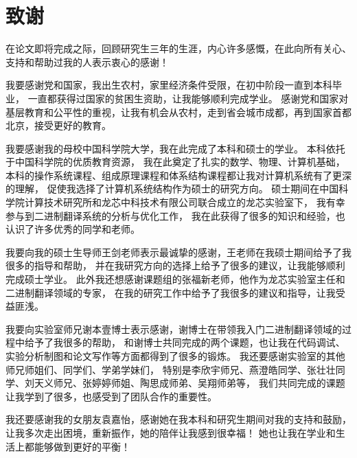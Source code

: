 \chapter[致谢]{致\quad 谢}%

在论文即将完成之际，回顾研究生三年的生涯，内心许多感慨，在此向所有关心、支持和帮助过我的人表示衷心的感谢！

我要感谢党和国家，我出生农村，家里经济条件受限，在初中阶段一直到本科毕业，
一直都获得过国家的贫困生资助，让我能够顺利完成学业。
感谢党和国家对基层教育和公平性的重视，让我有机会从农村，走到省会城市成都，再到国家首都北京，接受更好的教育。

我要感谢我的母校中国科学院大学，我在此完成了本科和硕士的学业。
本科依托于中国科学院的优质教育资源，
我在此奠定了扎实的数学、物理、计算机基础，
本科的操作系统课程、组成原理课程和体系结构课程都让我对计算机系统有了更深的理解，
促使我选择了计算机系统结构作为硕士的研究方向。
硕士期间在中国科学院计算技术研究所和龙芯中科技术有限公司联合成立的龙芯实验室下，
我有幸参与到二进制翻译系统的分析与优化工作，
我在此获得了很多的知识和经验，也认识了许多优秀的同学和老师。

我要向我的硕士生导师王剑老师表示最诚挚的感谢，王老师在我硕士期间给予了我很多的指导和帮助，
并在我研究方向的选择上给予了很多的建议，让我能够顺利完成硕士学业。
此外我还想感谢课题组的张福新老师，他作为龙芯实验室主任和二进制翻译领域的专家，
在我的研究工作中给予了我很多的建议和指导，让我受益匪浅。

我要向实验室师兄谢本壹博士表示感谢，谢博士在带领我入门二进制翻译领域的过程中给予了我很多的帮助，
和谢博士共同完成的两个课题，也让我在代码调试、实验分析制图和论文写作等方面都得到了很多的锻炼。
我还要感谢实验室的其他师兄师姐们、同学们、学弟学妹们，
特别是李欣宇师兄、燕澄皓同学、张壮壮同学、刘天义师兄、张婷婷师姐、陶思成师弟、吴翔师弟等，
我们共同完成的课题让我学到了很多，也感受到了团队合作的重要性。

我还要感谢我的女朋友袁嘉怡，感谢她在我本科和研究生期间对我的支持和鼓励，
让我多次走出困境，重新振作，她的陪伴让我感到很幸福！
她也让我在学业和生活上都能够做到更好的平衡！

